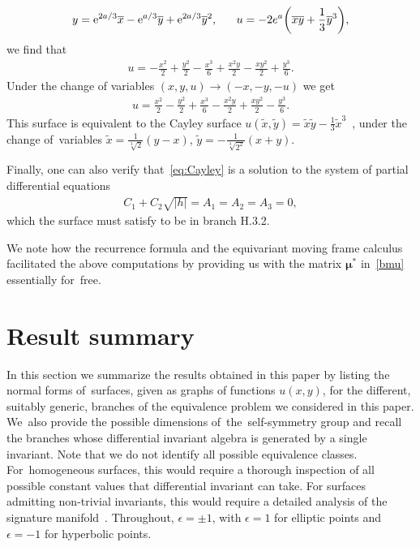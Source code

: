 \documentclass[pdftex]{sigma}%
\numberwithin{equation}{section}
\newcommand{\ox}{\overline{x}}
\newcommand{\oy}{\overline{y}}
\begin{document}
\begin{Example}
\begin{gather*}
y = {\rm e}^{2a/3}\ox-{\rm e}^{a/3}\oy + {\rm e}^{2a/3}\oy^2,\quad\ \
u= -2e^a\bigg(\ox\oy+\frac{1}{3}\oy^3\bigg),
\end{gather*}
we find that
\begin{gather*}
u = -\frac{x^2}{2}+\frac{y^2}{2}-\frac{x^3}{6}+\frac{x^2y}{2}-\frac{xy^2}{2}+\frac{y^3}{6}.
\end{gather*}
Under the change of variables $(x,y,u)\to(-x,-y,-u)$ we get
%
\begin{gather}\label{eq:Cayley}
u = \frac{x^2}{2}-\frac{y^2}{2}+\frac{x^3}{6}-\frac{x^2y}{2}+\frac{xy^2}{2}-\frac{y^3}{6}.
\end{gather}
%
This surface is equivalent to the Cayley surface $u(\widetilde{x},\widetilde{y})=\widetilde{x}\widetilde{y} - \frac{1}{3}\widetilde{x}^3$~\cite{NS-1994}, under the change of~vari\-ables $\widetilde{x} = \frac{1}{\sqrt[3]{2}}(y-x)$, $\widetilde{y} = -\frac{1}{\sqrt[3]{2^2}}(x+y)$.

Finally, one can also verify that~\eqref{eq:Cayley} is a solution to the system of partial differential equations
\begin{gather*}
C_1 + C_2\sqrt{|h|}=A_1=A_2=A_3=0,
\end{gather*}
which the surface must satisfy to be in branch H.3.2.
\end{Example}

\begin{Remark}We note how the recurrence formula and the equivariant moving frame calculus facilitated the above computations by providing us with the matrix $\bm{\mu}^*$ in~\eqref{bmu} essentially for~free.
\end{Remark}

\section{Result summary}\label{sec:summary}

In this section we summarize the results obtained in this paper by listing the normal forms of~surfaces, given as graphs of functions $u(x,y)$, for the different, suitably generic, branches of the equivalence problem we considered in this paper. We~also provide the possible dimensions of~the~self-symmetry group and recall the branches whose differential invariant algebra is gene\-ra\-ted by a single invariant. Note that we do not identify all possible equivalence classes. For~homo\-geneous surfaces, this would require a thorough inspection of all possible constant values that differential invariant can take. For surfaces admitting non-trivial invariants, this would require a detailed analysis of the signature manifold~\cite{O-1995}. Throughout, $\epsilon=\pm 1$, with $\epsilon=1$ for elliptic points and $\epsilon=-1$ for hyperbolic points.
\end{document}
